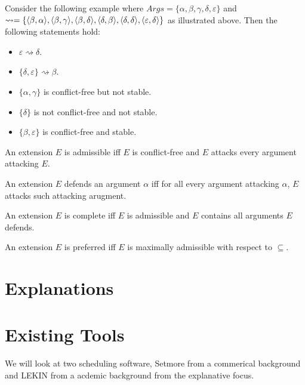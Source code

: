 Consider the following example where $Args=\{\alpha,\beta,\gamma,\delta,\varepsilon\}$ and $	\rightsquigarrow=\{
\langle{\beta},{\alpha}\rangle,\\
\langle{\beta},{\gamma}\rangle,
\langle{\beta},{\delta}\rangle,
\langle{\delta},{\beta}\rangle,
\langle{\delta},{\delta}\rangle,
\langle{\varepsilon},{\delta}\rangle
\}$ as illustrated above. Then the following statements hold:
\begin{itemize}
	\item $\varepsilon\rightsquigarrow\delta$.
	\item $\{\delta,\varepsilon\}\rightsquigarrow\beta$.
	\item $\{\alpha,\gamma\}$ is conflict-free but not stable.
	\item $\{\delta\}$ is not conflict-free and not stable.
	\item $\{\beta,\varepsilon\}$ is conflict-free and stable.
\end{itemize}

\begin{definition}
	An extension $E$ is admissible iff $E$ is conflict-free and $E$ attacks every argument attacking $E$.
\end{definition}

\begin{definition}
	An extension $E$ defends an argument $\alpha$ iff for all every argument attacking $\alpha$, $E$ attacks such attacking arugment. 
\end{definition}

\begin{definition}
	An extension $E$ is complete iff $E$ is admissible and $E$ contains all arguments $E$ defends.
\end{definition}

\begin{definition}
	An extension $E$ is preferred iff $E$ is maximally admissible with respect to $\subseteq$.
\end{definition}

\section{Explanations}



\section{Existing Tools}

We will look at two scheduling software, Setmore from a commerical background and LEKIN \cite{sta} from a acdemic background from the explanative focus.

